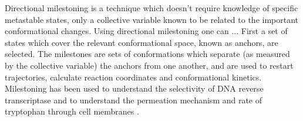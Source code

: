 Directional milestoning \cite{faradjianComputingTimeScales2004, majekMilestoningReactionCoordinate2010,kirmizialtinRevisitingComputingReaction2011a} is a technique which doesn't require knowledge of specific metastable states, only a  collective variable known to be related to the important conformational changes. Using directional milestoning one can ... First a set of states which cover the relevant conformational space, known as anchors, are selected. The milestones are sets of conformations which separate (as measured by the collective variable) the anchors from one another, and are used to restart trajectories, calculate reaction coordinates and conformational kinetics. Milestoning has been used to understand the selectivity of DNA reverse transcriptase \cite{kirmizialtinHowConformationalDynamics2012} and to understand the permeation mechanism and rate of tryptophan through cell membranes \cite{cardenasUnassistedTransportAcetyl2012}.  

